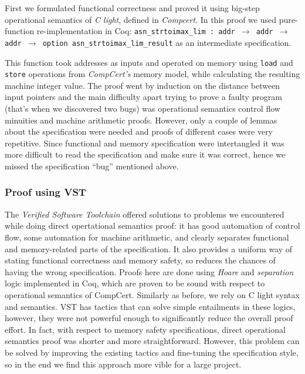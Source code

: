 \documentclass[acmsmall,nonacm]{acmart}
\begin{document}
First we formulated functional correctness and proved it using
big-step operational semantics of \textit{C light}, defined in
\textit{Compcert}. In this proof we used pure-function
re-implementation in Coq: \texttt{asn\_strtoimax\_lim : addr $\rightarrow$
  addr $\rightarrow$ addr $\rightarrow$ option
  asn\_strtoimax\_lim\_result} as an intermediate specification.

This function took addresses as inputs and operated on memory using
\texttt{load} and \texttt{store} operations from \textit{CompCert's}
memory model, while calculating the resulting machine integer
value. The proof went by induction on the distance between input
pointers and the main difficulty apart trying to prove a faulty
program (that's when we discovered two bugs) was operational semantics
control flow minuities and machine arithmetic proofs. However, only a
couple of lemmas about the specification were needed and proofs of different cases were very repetitive. Since functional
and memory specification were intertangled it was more difficult to
read the specification and make sure it was correct, hence we missed the specification ``bug'' mentioned above. 

\subsubsection{Proof using VST}

The \textit{Verified Software Toolchain} \cite{VST} offered
solutions to problems we encountered while doing direct opertational
semantics proof: it has good automation of control flow, some
automation for machine arithmetic, and clearly separates functional
and memory-related parts of the specification. It also provides a
uniform way of stating functional correctness and memory
safety, so reduces the chances of having the wrong specification. Proofs here are done using \textit{Hoare} and \textit{separation}
logic implemented in Coq, which are proven to be sound with respect to operational
semantics of CompCert. Similarly as before, we rely on C light syntax and semantics. VST has tactics that can solve simple entailments in these
logics, however, they were not powerful enough to significantly reduce
the overall proof effort. In fact, with respect to memory safety specifications,
direct operational semantics proof was shorter and more
straightforward. However, this problem can be solved by improving the existing tactics and fine-tuning the specification style, so in the end we find this approach more vible for a large project.
\end{document}
